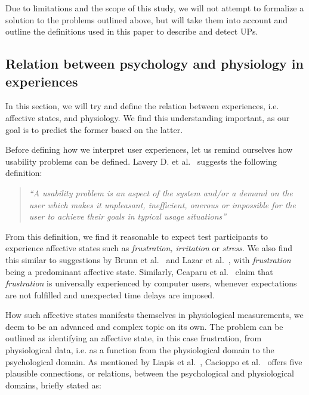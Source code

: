 Due to limitations and the scope of this study, we will not attempt to formalize a solution to the problems outlined
above, but will take them into account and outline the definitions used in this paper to describe and detect UPs.

\subsection{Relation between psychology and physiology in experiences}
In this section, we will try and define the relation between experiences, i.e. affective states, and physiology. We find
this understanding important, as our goal is to predict the former based on the latter.

Before defining how we interpret user experiences, let us remind ourselves how usability problems can be
defined. Lavery D. et al.~\cite[p. 254]{comp-eval-methods} suggests the following definition:

\begin{quotation}
  \textit{``A usability problem is an aspect of the system and/or a demand on the user which makes it unpleasant,
    inefficient, onerous or impossible for the user to achieve their goals in typical usage situations''} 
\end{quotation}

From this definition, we find it reasonable to expect test participants to experience affective states such as
\textit{frustration, irritation} or \textit{stress}. We also find this similar to suggestions by Brunn et
al.~\cite{LH-paper} and Lazar et al.~\cite{frustration_with_computers}, with \textit{frustration} being a predominant
affective state. Similarly, Ceaparu et al.~\cite{determining-causes-end-user-frust} claim that \textit{frustration} is
universally experienced by computer users, whenever expectations are not fulfilled and unexpected time delays are
imposed.

How such affective states manifests themselves in physiological measurements, we deem to be an advanced and complex
topic on its own. The problem can be outlined as identifying an affective state, in this case frustration, from
physiological data, i.e. as a function from the physiological domain to the psychological domain.  As mentioned by
Liapis et al.~\cite{fusion4}, Cacioppo et al.~\cite[p. 8-9]{handbook-psychophysiology} offers five plausible
connections, or relations, between the psychological and physiological domains, briefly stated as:

